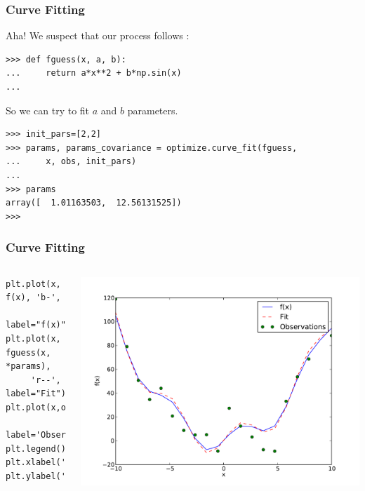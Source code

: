 \documentclass[10pt,colorlinks]{beamer}
\begin{document}
\begin{frame}[fragile]\frametitle{Curve Fitting}

Aha! We suspect that our process follows : 
\begin{verbatim}
>>> def fguess(x, a, b):
...     return a*x**2 + b*np.sin(x)
... 
\end{verbatim}


So we can try to fit $a$ and $b$ parameters. 
\begin{verbatim}
>>> init_pars=[2,2]
>>> params, params_covariance = optimize.curve_fit(fguess, 
...     x, obs, init_pars)
... 
>>> params
array([  1.01163503,  12.56131525])
>>> 
\end{verbatim}

\end{frame}

\begin{frame}[fragile]\frametitle{Curve Fitting}
 \begin{columns}[c]
\small
\begin{verbatim}
plt.plot(x, f(x), 'b-', 
    label="f(x)")
plt.plot(x, fguess(x, *params),
     'r--', label="Fit")
plt.plot(x,obs,'go',
    label='Observations')
plt.legend()
plt.xlabel('x')
plt.ylabel('f(x)')
\end{verbatim}

\includegraphics[width=\textwidth]{plwfigis/CursP_3_figure48}

 \end{columns}
\end{frame}
\end{document}
